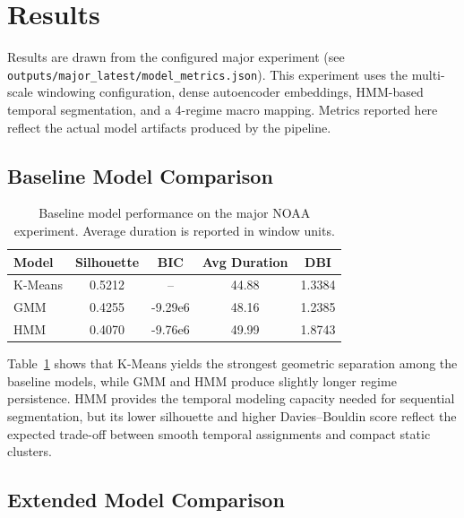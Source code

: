\documentclass[conference]{IEEEtran}
\begin{document}
\section{Results}
Results are drawn from the configured major experiment (see \texttt{outputs/major\_latest/model\_metrics.json}). This experiment uses the multi-scale windowing configuration, dense autoencoder embeddings, HMM-based temporal segmentation, and a 4-regime macro mapping. Metrics reported here reflect the actual model artifacts produced by the pipeline.

\subsection{Baseline Model Comparison}
\begin{table}[h]
\centering
\caption{Baseline model performance on the major NOAA experiment. Average duration is reported in window units.}
\label{tab:baseline_results}
\begin{tabular}{lcccc}
\hline
Model & Silhouette & BIC & Avg Duration & DBI \\
\hline
K-Means & 0.5212 & -- & 44.88 & 1.3384 \\
GMM & 0.4255 & -9.29e6 & 48.16 & 1.2385 \\
HMM & 0.4070 & -9.76e6 & 49.99 & 1.8743 \\
\hline
\end{tabular}
\end{table}

Table~\ref{tab:baseline_results} shows that K-Means yields the strongest geometric separation among the baseline models, while GMM and HMM produce slightly longer regime persistence. HMM provides the temporal modeling capacity needed for sequential segmentation, but its lower silhouette and higher Davies--Bouldin score reflect the expected trade-off between smooth temporal assignments and compact static clusters.

\subsection{Extended Model Comparison}
\begin{table}[h]
\centering
\caption{Extended comparison including latent-space and hierarchical models. Average duration is reported in window units where available.}
\label{tab:extended_results}
\normalsize
{}
\end{table}
\end{document}
